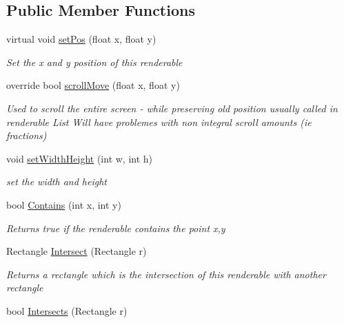 \subsection*{Public Member Functions}
\begin{DoxyCompactItemize}
\item 
virtual void \mbox{\hyperlink{class_r_c___framework_1_1_r_c___renderable_bounded_a49d38185d66bf150677aaf9cc35eb4fa}{set\+Pos}} (float x, float y)
\begin{DoxyCompactList}\small\item\em Set the x and y position of this renderable \end{DoxyCompactList}\item 
override bool \mbox{\hyperlink{class_r_c___framework_1_1_r_c___renderable_bounded_a000dd516577e50fb39fc3e1acc774435}{scroll\+Move}} (float x, float y)
\begin{DoxyCompactList}\small\item\em Used to scroll the entire screen -\/ while preserving old position usually called in renderable List Will have problemes with non integral scroll amounts (ie fractions) \end{DoxyCompactList}\item 
void \mbox{\hyperlink{class_r_c___framework_1_1_r_c___renderable_bounded_a871ee20b647861fb3fb93e112375db21}{set\+Width\+Height}} (int w, int h)
\begin{DoxyCompactList}\small\item\em set the width and height \end{DoxyCompactList}\item 
bool \mbox{\hyperlink{class_r_c___framework_1_1_r_c___renderable_bounded_a36f45a8174f4cee93a65085e015a2b2e}{Contains}} (int x, int y)
\begin{DoxyCompactList}\small\item\em Returns true if the renderable contains the point x,y \end{DoxyCompactList}\item 
Rectangle \mbox{\hyperlink{class_r_c___framework_1_1_r_c___renderable_bounded_a744532d85e586e0aa52f75dd1af3f60f}{Intersect}} (Rectangle r)
\begin{DoxyCompactList}\small\item\em Returns a rectangle which is the intersection of this renderable with another rectangle \end{DoxyCompactList}\item 
bool \mbox{\hyperlink{class_r_c___framework_1_1_r_c___renderable_bounded_a394581a8ad6bf9a472214fe4316ea37c}{Intersects}} (Rectangle r)

\end{DoxyCompactItemize}
